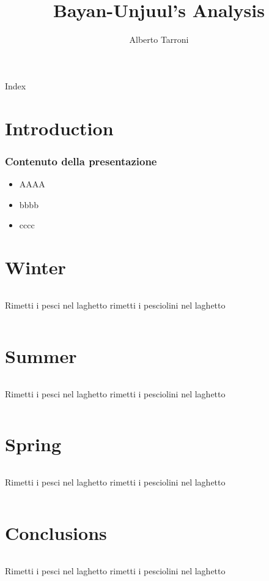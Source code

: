 \documentclass[10pt]{beamer}
\title{Bayan-Unjuul's Analysis}
\author{Alberto Tarroni}
\begin{document}
\maketitle
\begin{frame}{Index}
\tableofcontents
\end{frame}

\section{Introduction}
\begin{frame}
\frametitle{Contenuto della presentazione}
\begin{itemize}
	\item<1-> AAAA
	\item<2-> bbbb
	\item<3-> cccc
\end{itemize}
\end{frame}

\section{Winter}

\begin{frame}
	\begin{columns}
		Rimetti i pesci nel laghetto
		rimetti i pesciolini nel laghetto
	\end{columns}
\end{frame}


\section{Summer}
\begin{frame}
	\begin{columns}
		Rimetti i pesci nel laghetto
		rimetti i pesciolini nel laghetto
	\end{columns}
\end{frame}


\section{Spring}
\begin{frame}
	\begin{columns}
		Rimetti i pesci nel laghetto
		rimetti i pesciolini nel laghetto
	\end{columns}
\end{frame}


\section{Conclusions}
\begin{frame}
	\begin{columns}
		Rimetti i pesci nel laghetto
		rimetti i pesciolini nel laghetto
	\end{columns}
\end{frame}
\end{document}
